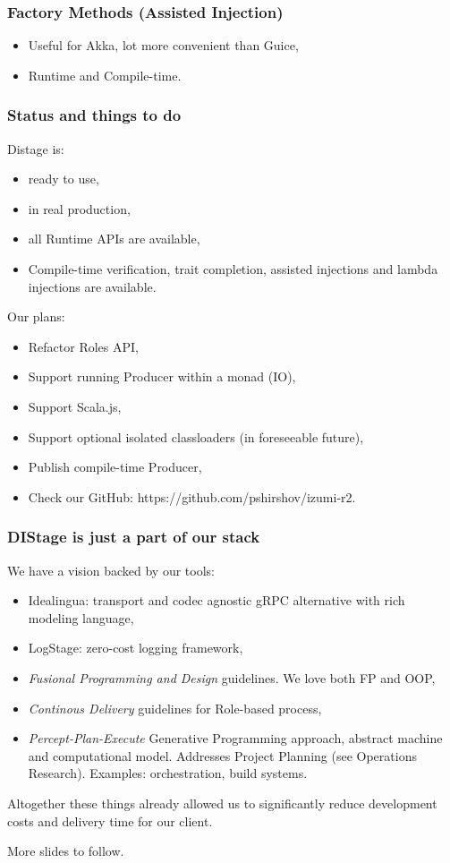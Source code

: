 \documentclass[usenames,dvipsnames]{beamer}
\begin{document}
\begin{frame}
\frametitle{Factory Methods (Assisted Injection)}
\begin{itemize}
\item Useful for Akka, lot more convenient than Guice,
\item Runtime and Compile-time.
\end{itemize}
\end{frame}

\begin{frame}
\frametitle{Status and things to do}
Distage is:
\begin{itemize}
\item ready to use,
\item in real production,
\item all Runtime APIs are available,
\item Compile-time verification, trait completion, assisted injections and lambda injections are available.
\end{itemize}
\vspace{0.3cm}
Our plans:
\begin{itemize}
\item Refactor Roles API,
\item Support running Producer within a monad (IO),
\item Support Scala.js,
\item Support optional isolated classloaders (in foreseeable future),
\item Publish compile-time Producer,
\item Check our GitHub: https://github.com/pshirshov/izumi-r2.
\end{itemize}
\end{frame}

\begin{frame}
\frametitle{DIStage is just a part of our stack}
We have a vision backed by our tools:
\begin{itemize}
\item Idealingua: transport and codec agnostic gRPC alternative with rich modeling language,
\item LogStage: zero-cost logging framework,
\item \textit{Fusional Programming and Design} guidelines. We love both FP and OOP,
\item \textit{Continous Delivery} guidelines for Role-based process, 
\item \textit{Percept-Plan-Execute} Generative Programming approach, abstract machine and computational model.
Addresses Project Planning (see Operations Research). Examples: orchestration, build systems.
\end{itemize}

Altogether these things already allowed us to significantly reduce development costs and
delivery time for our client.\newline

More slides to follow.
\end{frame}
\end{document}
